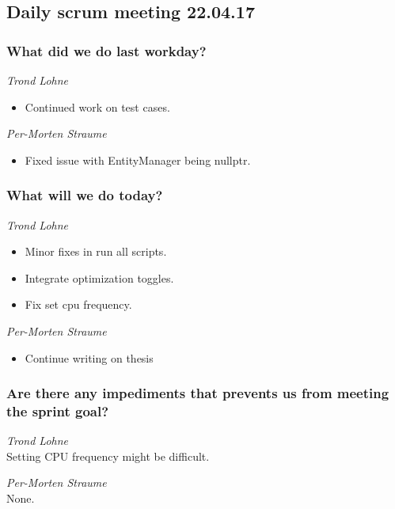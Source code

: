 \documentclass{article}
\begin{document}
\begin{center}
\subsection*{Daily scrum meeting 22.04.17}
\end{center}
\bigskip


\subsubsection*{What did we do last workday?}

\noindent\textit{Trond Lohne}
\begin{itemize}
	\item
	Continued work on test cases.
\end{itemize}

\medskip

\noindent\textit{Per-Morten Straume}
\begin{itemize}
	\item
	Fixed issue with EntityManager being nullptr.
\end{itemize}


\subsubsection*{What will we do today?}

\noindent\textit{Trond Lohne}
\begin{itemize}
    \item
    Minor fixes in run all scripts.

    \item
    Integrate optimization toggles.

    \item
    Fix set cpu frequency.
\end{itemize}

\medskip

\noindent\textit{Per-Morten Straume}
\begin{itemize}
	\item
	Continue writing on thesis
\end{itemize}


\subsubsection*{Are there any impediments that prevents us from meeting the sprint goal?}

\noindent\textit{Trond Lohne}\\
Setting CPU frequency might be difficult.

\medskip

\noindent\textit{Per-Morten Straume}\\
None.
\end{document}
